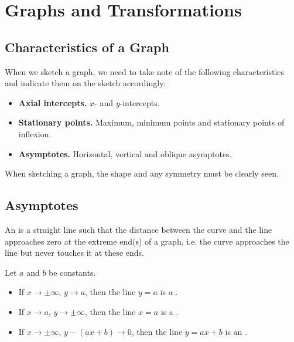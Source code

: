 \chapter{Graphs and Transformations}

\section{Characteristics of a Graph}

When we sketch a graph, we need to take note of the following characteristics and indicate them on the sketch accordingly:
\begin{itemize}
    \item \textbf{Axial intercepts.} $x$- and $y$-intercepts.
    \item \textbf{Stationary points.} Maximum, minimum points and stationary points of inflexion.
    \item \textbf{Asymptotes.} Horizontal, vertical and oblique asymptotes.
\end{itemize}

When sketching a graph, the shape and any symmetry must be clearly seen.

\section{Asymptotes}

\begin{definition}
    An  is a straight line such that the distance between the curve and the line approaches zero at the extreme end(s) of a graph, i.e. the curve approaches the line but never touches it at these ends.
\end{definition}

\begin{definition}
    Let $a$ and $b$ be constants.

    \begin{itemize}
        \item If $x \to \pm \infty$, $y \to a$, then the line $y = a$ is a .
        \item If $x \to a$, $y \to \pm \infty$, then the line $x = a$ is a .
        \item If $x \to \pm \infty$, $y - (ax + b) \to 0$, then the line $y = ax + b$ is an .
    \end{itemize}
\end{definition}

